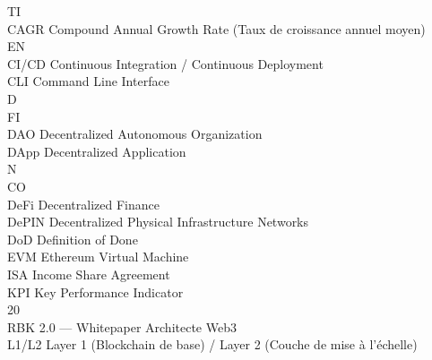 \vspace{0.5em}
\vspace{0.5em}
TI\\
CAGR Compound Annual Growth Rate (Taux de croissance annuel moyen)\\
\vspace{0.5em}
\vspace{0.5em}
\vspace{0.5em}
\vspace{0.5em}
EN\\
CI/CD Continuous Integration / Continuous Deployment\\
\vspace{0.5em}
CLI Command Line Interface\\
\vspace{0.5em}
\vspace{0.5em}
\vspace{0.5em}
\vspace{0.5em}
D\\
FI\\
DAO Decentralized Autonomous Organization\\
\vspace{0.5em}
DApp Decentralized Application\\
N\\
CO\\
DeFi Decentralized Finance\\
\vspace{0.5em}
DePIN Decentralized Physical Infrastructure Networks\\
\vspace{0.5em}
DoD Definition of Done\\
\vspace{0.5em}
EVM Ethereum Virtual Machine\\
\vspace{0.5em}
ISA Income Share Agreement\\
\vspace{0.5em}
KPI Key Performance Indicator\\
\vspace{0.5em}
\vspace{0.5em}
\vspace{0.5em}
20\\
RBK 2.0 — Whitepaper Architecte Web3\\
\vspace{0.5em}
\vspace{0.5em}
L1/L2 Layer 1 (Blockchain de base) / Layer 2 (Couche de mise à l’échelle)\\
\vspace{0.5em}
